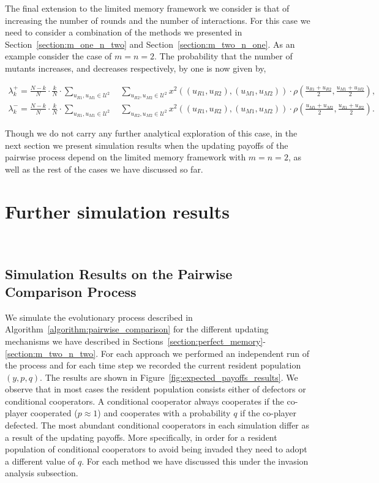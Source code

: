 \documentclass[11pt]{article}
\theoremstyle{plainCl1}
\theoremstyle{plainCl2}
\begin{document}
The final extension to the limited memory framework we consider is that of
increasing the number of rounds and the number of interactions. For this case we
need to consider a combination of the methods we presented in
Section~\ref{section:m_one_n_two} and Section~\ref{section:m_two_n_one}. As an
example consider the case of \(m=n=2\). The probability that the number of
mutants increases, and decreases respectively, by one is now given by,

\begin{align}
  \lambda^+_k=\frac{N\!-\!k}{N}\cdot \frac{k}{N}\cdot \sum_{u_{R1},u_{M1}\in\mathcal{U}^{2}} \quad \sum_{u_{R2},u_{M2}\in\mathcal{U}^{2}} x^{2}((u_{R1}, u_{R2}),(u_{M1}, u_{M2}))\cdot \rho\left(\frac{u_{R1} + u_{R2}}{2}, \frac{u_{M1} + u_{M2}}{2}\right), \\
  \lambda^-_k=\frac{N\!-\!k}{N}\cdot \frac{k}{N}\cdot \sum_{u_{R1},u_{M1}\in\mathcal{U}^{2}} \quad \sum_{u_{R2},u_{M2}\in\mathcal{U}^{2}} x^{2}((u_{R1}, u_{R2}),(u_{M1}, u_{M2}))\cdot \rho\left(\frac{u_{M1} + u_{M2}}{2}, \frac{u_{R1} + u_{R2}}{2}\right).
\end{align}

Though we do not carry any further analytical exploration of this case, in the
next section we present simulation results when the updating payoffs of the
pairwise process depend on the limited memory framework with \(m=n=2\), as well
as the rest of the cases we have discussed so far.



\section{Further simulation results}~\label{section:furthersimulations}


\subsection{Simulation Results on the Pairwise Comparison Process}\label{section:simulation_results}

We simulate the evolutionary process described in
Algorithm~\ref{algorithm:pairwise_comparison} for the different updating
mechanisms we have described in
Sections~\ref{section:perfect_memory}-\ref{section:m_two_n_two}. For each
approach we performed an independent run of the process and for each time step we
recorded the current resident population \((y, p, q)\). The results are shown in
Figure~\ref{fig:expected_payoffs_results}. We observe that in most cases the
resident population consists either of defectors or conditional cooperators. A
conditional cooperator always cooperates if the co-player cooperated
($p\approx1$) and cooperates with a probability \(q\) if the co-player defected.
The most abundant conditional cooperators in each simulation differ as a
result of the updating payoffs. More specifically, in order for a resident
population of conditional cooperators to avoid being invaded they need to adopt
a different value of \(q\). For each method we have discussed this under the
invasion analysis subsection. 
\end{document}
